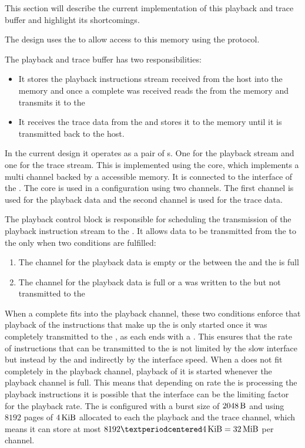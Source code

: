 This section will describe the current implementation of this playback and trace buffer and highlight its shortcomings.

The \FPGA{} design uses the \XilinxMIG{} to allow access to this \DDR{} memory using the \AXI{} protocol.

The playback and trace buffer has two responsibilities:
\begin{itemize}
  \item It stores the playback instructions stream received from the host into the \DDR{} memory and once a complete \PlaybackProgram{} was received reads the \PlaybackProgram{} from the memory and transmits it to the \pbexec{}
  \item It receives the trace data from the \pbexec{} and stores it to the \DDR{} memory until it is transmitted back to the host.
\end{itemize}

In the current \FPGA{} design it operates as a pair of \FIFO{}s. One for the playback stream and one for the trace stream. This \FIFO{} is implemented using the \Xilinx{} \VFIFO{} core, which implements a multi channel \FIFO{} backed by a \AXI{} accessible memory. It is connected to the \AXI{} interface of the \XilinxMIG{}. The \VFIFO{} core is used in a configuration using two channels. The first channel is used for the playback data and the second channel is used for the trace data.

The playback control block is responsible for scheduling the transmission of the playback instruction stream to the \pbexec{}.
It allows data to be transmitted from the \VFIFO{} to the \pbexec{} only  when two conditions are fulfilled:
\begin{enumerate}
\item The \VFIFO{} channel for the playback data is empty or the \FIFO{} between the \VFIFO{} and the \pbexec{} is full
\item The \VFIFO{} channel for the playback data is full or a \haltInstr{} was written to the \VFIFO{} but not transmitted to the \pbexec{}
\end{enumerate}
When a complete \PlaybackProgram{} fits into the \VFIFO{} playback channel, these two conditions enforce that playback of the instructions that make up the \PlaybackProgram{} is only started once it was completely transmitted to the \VFIFO{}, as each \PlaybackProgram{} ends with a \haltInstr{}. This ensures that the rate of instructions that can be transmitted to the \pbexec{} is not limited by the slow \HostARQ{} interface but instead by the \VFIFO{} and indirectly by the \XilinxMIG{} interface speed.
When a \PlaybackProgram{} does not fit completely in the \VFIFO{} playback channel, playback of it is started whenever the \VFIFO{} playback channel is full. This means that depending on rate the \pbexec{} is processing the playback instructions it is possible that the \HostARQ{} interface can be the limiting factor for the playback rate.
The \VFIFO{} is configured with a burst size of \(\SI{2048}{\byte}\) and using $\num{8192}$ pages of $\SI{4}{\kibi\byte}$ allocated to each the playback and the trace channel, which means it can store at most \(\num{8192} · \SI{4}{\kibi\byte} = \SI{32}{\mebi\byte}\) per channel.

